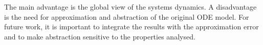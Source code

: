 \documentclass{llncs}
\begin{document}
The main advantage is the global view of the systems dynamics. A disadvantage is the need for approximation and abstraction of the original ODE model. For future work, it is important to integrate the results with the approximation error and to make abstraction sensitive to the properties analysed. 




\end{document}
